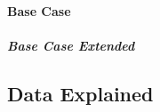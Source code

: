 \documentclass[12pt]{article}
\begin{document}
\lipsum[8]

\paragraph{Base Case}

\lipsum[9]

\subparagraph{Base Case Extended}

\lipsum[10]

\clearpage

\iffalse
\appendix
\appendixpage
\addappheadtotoc

\section{Data Explained}

\lipsum[3-4]
\fi

\begin{appendices}
\section{Data Explained}
\lipsum[3-4]
\end{appendices}
\end{document}
